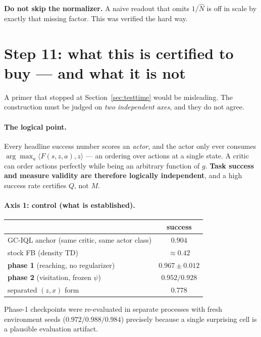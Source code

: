 \documentclass[11pt]{article}
\begin{document}
\begin{keybox}
\textbf{Do not skip the normalizer.} A naive readout that omits $1/\hat N$ is off
in scale by exactly that missing factor. This was verified the hard way.
\end{keybox}

\section{Step 11: what this is certified to buy --- and what it is not}
\label{sec:certified}

A primer that stopped at Section~\ref{sec:testtime} would be misleading. The
construction must be judged on \emph{two independent axes}, and they do not agree.

\paragraph{The logical point.} Every headline success number scores an
\emph{actor}, and the actor only ever consumes $\arg\max_a \langle F(s,z,a),z\rangle$
--- an ordering over actions at a single state. A critic can order actions
perfectly while being an arbitrary function of $g$. \textbf{Task success and
measure validity are therefore logically independent}, and a high success rate
certifies $Q$, not $M$.

\paragraph{Axis 1: control (what is established).}
\begin{center}
\begin{tabular}{lc}
\toprule
 & success \\
\midrule
GC-IQL anchor (same critic, same actor class) & $0.904$ \\
stock FB (density TD) & $\approx 0.42$ \\
\textbf{phase 1} (reaching, no regularizer) & $\mathbf{0.967 \pm 0.012}$ \\
\textbf{phase 2} (visitation, frozen $\psi$) & $\mathbf{0.952 / 0.928}$ \\
separated $(z,x)$ form & $0.778$ \\
\bottomrule
\end{tabular}
\end{center}
Phase-1 checkpoints were re-evaluated in separate processes with fresh
environment seeds ($0.972/0.988/0.984$) precisely because a single surprising cell
is a plausible evaluation artifact.
\end{document}
